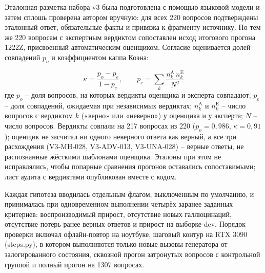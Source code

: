 \documentclass[14pt,a4paper]{extarticle}
\begin{document}
Эталонная разметка набора v3 была подготовлена с помощью языковой модели и затем сплошь проверена автором вручную: для всех 220 вопросов подтверждены эталонный ответ, обязательные факты и привязка к фрагменту-источнику. По тем же 220 вопросам с экспертным вердиктом сопоставлен исход итогового прогона 1222Z, присвоенный автоматическим оценщиком. Согласие оценивается долей совпадений $p_o$ и коэффициентом каппа Коэна:

\begin{equation}
\kappa = \frac{p_o - p_e}{1 - p_e}, \qquad p_e = \sum_{k} \frac{n_{k}^{\mathrm{A}} \, n_{k}^{\mathrm{E}}}{N^{2}}
\tag{12}
\end{equation}
\noindent где $p_o$ – доля вопросов, на которых вердикты оценщика и эксперта совпадают; $p_e$ – доля совпадений, ожидаемая при независимых вердиктах; $n_{k}^{\mathrm{A}}$ и $n_{k}^{\mathrm{E}}$ – число вопросов с вердиктом $k$ («верно» или «неверно») у оценщика и у эксперта; $N$ – число вопросов. Вердикты совпали на 217 вопросах из 220 ($p_o = 0{,}986$, $\kappa = 0{,}91$); оценщик не засчитал ни одного неверного ответа как верный, а все три расхождения (V3‑MH‑028, V3‑ADV‑013, V3‑UNA‑028) – верные ответы, не распознанные жёсткими шаблонами оценщика. Эталоны при этом не исправлялись, чтобы попарные сравнения прогонов оставались сопоставимыми; лист аудита с вердиктами опубликован вместе с кодом.

Каждая гипотеза вводилась отдельным флагом, выключенным по умолчанию, и принималась при одновременном выполнении четырёх заранее заданных критериев: воспроизводимый прирост, отсутствие новых галлюцинаций, отсутствие потерь ранее верных ответов и прирост на выборке dev. Порядок проверки включал офлайн-повтор на ноутбуке, шаговый контур на RTX 3090 (steps.py), в котором выполняются только новые вызовы генератора от залогированного состояния, сквозной прогон затронутых вопросов с контрольной группой и полный прогон на 1307 вопросах.
\end{document}
